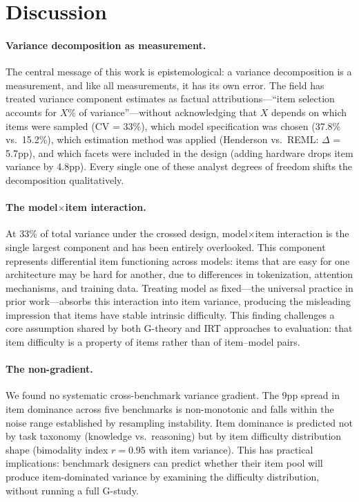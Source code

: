 \documentclass[11pt]{article}
\begin{document}
\section{Discussion}

\paragraph{Variance decomposition as measurement.}
The central message of this work is epistemological: a variance decomposition is a measurement, and like all measurements, it has its own error.
The field has treated variance component estimates as factual attributions---``item selection accounts for $X$\% of variance''---without acknowledging that $X$ depends on which items were sampled (CV = 33\%), which model specification was chosen (37.8\% vs.\ 15.2\%), which estimation method was applied (Henderson vs.\ REML: $\Delta$ = 5.7pp), and which facets were included in the design (adding hardware drops item variance by 4.8pp).
Every single one of these analyst degrees of freedom shifts the decomposition qualitatively.

\paragraph{The model$\times$item interaction.}
At 33\% of total variance under the crossed design, model$\times$item interaction is the single largest component and has been entirely overlooked.
This component represents differential item functioning across models: items that are easy for one architecture may be hard for another, due to differences in tokenization, attention mechanisms, and training data.
Treating model as fixed---the universal practice in prior work---absorbs this interaction into item variance, producing the misleading impression that items have stable intrinsic difficulty.
This finding challenges a core assumption shared by both G-theory and IRT approaches to evaluation: that item difficulty is a property of items rather than of item--model pairs.

\paragraph{The non-gradient.}
We found no systematic cross-benchmark variance gradient.
The 9pp spread in item dominance across five benchmarks is non-monotonic and falls within the noise range established by resampling instability.
Item dominance is predicted not by task taxonomy (knowledge vs.\ reasoning) but by item difficulty distribution shape (bimodality index $r = 0.95$ with item variance).
This has practical implications: benchmark designers can predict whether their item pool will produce item-dominated variance by examining the difficulty distribution, without running a full G-study.
\end{document}
